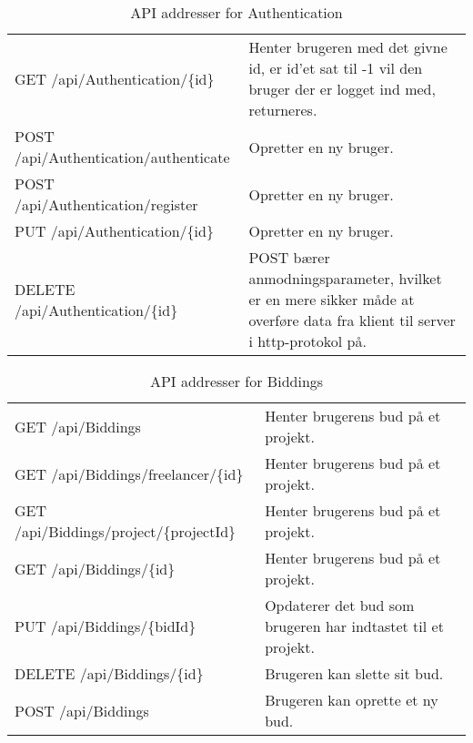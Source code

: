 \begin{table}[H]
	\centering
	\caption{API addresser for Authentication}
	\label{tab:web_user}
	\begin{tabular}{|L{0.3\textwidth}|L{0.70\textwidth}|}
		\hline
		\\
		\hline
		GET \newline
		/api/Authentication/\{id\} &
		Henter brugeren med det givne id, er id'et sat til -1 vil den bruger der er logget ind med, returneres. \\
		\hline
		POST \newline
		/api/Authentication/authenticate &
		Opretter en ny bruger. \\
        \hline
        POST \newline
		/api/Authentication/register &
		Opretter en ny bruger. \\
        \hline
        PUT \newline
		/api/Authentication/\{id\} &
		Opretter en ny bruger. \\
		\hline
		DELETE \newline
		/api/Authentication/\{id\} &
		POST bærer anmodningsparameter, hvilket er en mere sikker måde at overføre data fra klient til server i http-protokol på. \\
		\hline
	\end{tabular}
\end{table}


\begin{table}[H]
	\centering
	\caption{API addresser for Biddings}
	\label{tab:web_user}
	\begin{tabular}{|L{0.3\textwidth}|L{0.70\textwidth}|}
		\hline
		\\
		\hline
		GET \newline
		/api/Biddings &
		Henter brugerens bud på et projekt. \\
        \hline
        GET \newline
		/api/Biddings/freelancer/\{id\} &
		Henter brugerens bud på et projekt. \\
        \hline
        GET \newline
		/api/Biddings/project/\{projectId\} &
		Henter brugerens bud på et projekt. \\
        \hline
        GET \newline
		/api/Biddings/\{id\} &
		Henter brugerens bud på et projekt. \\
		\hline
		PUT \newline
		/api/Biddings/\{bidId\} &
		Opdaterer det bud som brugeren har indtastet til et projekt. \\
		\hline
		DELETE \newline
		/api/Biddings/\{id\} &
		Brugeren kan slette sit bud. \\
		\hline
		POST \newline
		/api/Biddings &
		Brugeren kan oprette et ny bud. \\
		\hline
	
	\end{tabular}
\end{table}

